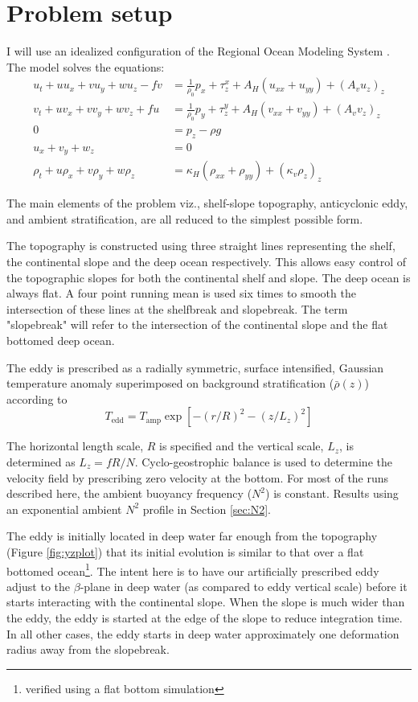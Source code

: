 \section{Problem setup}
\label{sec-2}
I will use an idealized configuration of the Regional Ocean Modeling System \citep{Shchepetkin2005}. The model solves the equations:
\begin{align}
\label{eq:eqroms}
    u_t + uu_x + vu_y + wu_z - fv &= \frac{1}{ρ_0}  p_x + τ^x_z + A_H (u_{xx} + u_{yy}) + \left(A_v u_{z}\right)_z \\
    v_t + uv_x + vv_y + wv_z + fu &= \frac{1}{ρ_0}  p_y + τ^y_z + A_H (v_{xx} + v_{yy}) + \left(A_v v_{z}\right)_z \\
    0 &= p_z - ρg \\
    u_x + v_y + w_z &= 0 \\
    ρ_t + uρ_x + vρ_y + wρ_z &= κ_H\left(ρ_{xx} + ρ_{yy} \right) + \left(κ_vρ_z\right)_z
\end{align}

The main elements of the problem viz., shelf-slope topography, anticyclonic eddy, and ambient stratification, are all reduced to the simplest possible form.

The topography is constructed using three straight lines representing the shelf, the continental slope and the deep ocean respectively. This allows easy control of the topographic slopes for both the continental shelf and slope. The deep ocean is always flat. A four point running mean is used six times to smooth the intersection of these lines at the shelfbreak and slopebreak. The term "slopebreak" will refer to the intersection of the continental slope and the flat bottomed deep ocean.

The eddy is prescribed as a radially symmetric, surface intensified, Gaussian temperature anomaly superimposed on background stratification ($\bar{ρ}(z)$) according to
\begin{equation}
\label{eq:tanom}
T_\text{edd} = T_\text{amp} \exp{\left[-(r/R)^2 - (z/L_z)^2\right]}
\end{equation}

The horizontal length scale, $R$ is specified and the vertical scale, $L_z$, is determined as $L_z = fR/N$. Cyclo-geostrophic balance is used to determine the velocity field by prescribing zero velocity at the bottom. For most of the runs described here, the ambient buoyancy frequency ($N^2$) is constant. Results using an exponential ambient $N^2$ profile in Section \ref{sec:N2}.

The eddy is initially located in deep water far enough from the topography (Figure \ref{fig:yzplot}) that its initial evolution is similar to that over a flat bottomed ocean\footnote{verified using a flat bottom simulation}. The intent here is to have our artificially prescribed eddy adjust to the $β$-plane in deep water (as compared to eddy vertical scale) before it starts interacting with the continental slope. When the slope is much wider than the eddy, the eddy is started at the edge of the slope to reduce integration time. In all other cases, the eddy starts in deep water approximately one deformation radius away from the slopebreak.

